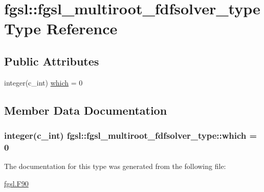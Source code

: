 \hypertarget{structfgsl_1_1fgsl__multiroot__fdfsolver__type}{\section{fgsl\-:\-:fgsl\-\_\-multiroot\-\_\-fdfsolver\-\_\-type Type Reference}
\label{structfgsl_1_1fgsl__multiroot__fdfsolver__type}
}
\subsection*{Public Attributes}
\begin{DoxyCompactItemize}
\item 
integer(c\-\_\-int) \hyperlink{structfgsl_1_1fgsl__multiroot__fdfsolver__type_a4ad354f53a02fab56b9bce7f036ac2f9}{which} = 0
\end{DoxyCompactItemize}


\subsection{Member Data Documentation}
\hypertarget{structfgsl_1_1fgsl__multiroot__fdfsolver__type_a4ad354f53a02fab56b9bce7f036ac2f9}{
\subsubsection[{which}]{\setlength{\rightskip}{0pt plus 5cm}integer(c\-\_\-int) fgsl\-::fgsl\-\_\-multiroot\-\_\-fdfsolver\-\_\-type\-::which = 0}}\label{structfgsl_1_1fgsl__multiroot__fdfsolver__type_a4ad354f53a02fab56b9bce7f036ac2f9}


The documentation for this type was generated from the following file\-:\begin{DoxyCompactItemize}
\item 
\hyperlink{fgsl_8F90}{fgsl.\-F90}\end{DoxyCompactItemize}
